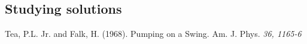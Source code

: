 \documentclass[11pt,letter, swedish, english
]{article}
\begin{document}

\subsection{Studying solutions}




\begin{thebibliography}{9}

Tea, P.L. Jr. and Falk, H. (1968). Pumping on a Swing. Am. J. Phys. 
\textit{36, 1165-6}

 

\end{thebibliography}
\end{document}
